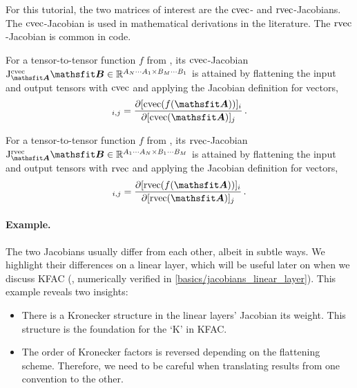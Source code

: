\switchcolumn[1]
\switchcolumn[0]

For this tutorial, the two matrices of interest are the $\operatorname{cvec}$- and $\operatorname{rvec}$-Jacobians.
The $\operatorname{cvec}$-Jacobian is used in mathematical derivations in the literature.
The $\operatorname{rvec}$-Jacobian is common in code.

\begin{definition}\label{def:cvec_jacobian}
  For a tensor-to-tensor function $f$ from , its $\operatorname{cvec}$-Jacobian $\jac^{\cvec}_{\tA}\tB \in \sR^{A_N \cdots A_1 \times B_M \cdots B_1}$ is attained by flattening the input and output tensors with $\operatorname{cvec}$ and applying the Jacobian definition for vectors,
  \begin{align*}
    [\jac^{\cvec}_{\tA}\tB]_{i,j}
    =
    \frac{\partial [\cvec(f(\tA))]_i}{\partial [\cvec(\tA)]_j}\,.
  \end{align*}
\end{definition}

\begin{definition}\label{def:rvec_jacobian}
  For a tensor-to-tensor function $f$ from , its $\operatorname{rvec}$-Jacobian $\jac^{\rvec}_{\tA}\tB \in \sR^{A_1 \cdots A_N \times B_1 \cdots B_M}$ is attained by flattening the input and output tensors with $\operatorname{rvec}$ and applying the Jacobian definition for vectors,
  \begin{align*}
    [\jac^{\rvec}_{\tA}\tB]_{i,j}
    =
    \frac{\partial [\rvec(f(\tA))]_i}{\partial [\rvec(\tA)]_j}\,.
  \end{align*}
\end{definition}

\paragraph{Example.} The two Jacobians usually differ from each other, albeit in subtle ways.
We highlight their differences on a linear layer, which will be useful later on when we discuss KFAC (, numerically verified in \cref{basics/jacobians_linear_layer}).
This example reveals two insights:
\begin{itemize}
\item There is a Kronecker structure in the linear layers' Jacobian \wrt its weight.
  This structure is the foundation for the `K' in KFAC.

\item The order of Kronecker factors is reversed depending on the flattening scheme.
  Therefore, we need to be careful when translating results from one convention to the other.
\end{itemize}

